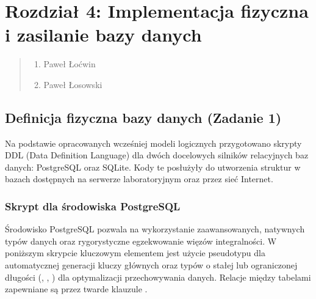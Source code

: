 \documentclass[letterpaper,10pt,english]{sphinxmanual}
\begin{document}
\chapter{Rozdział 4: Implementacja fizyczna i zasilanie bazy danych}
\label{\detokenize{rozdzial_4/index:rozdzial-4-implementacja-fizyczna-i-zasilanie-bazy-danych}}\label{\detokenize{rozdzial_4/index::doc}}\begin{quote}\begin{description}
\begin{enumerate}
%
\item {} 
\sphinxAtStartPar
Paweł Łoćwin

\item {} 
\sphinxAtStartPar
Paweł Łosowski

\end{enumerate}

\end{description}\end{quote}


\section{Definicja fizyczna bazy danych (Zadanie 1)}
\label{\detokenize{rozdzial_4/index:definicja-fizyczna-bazy-danych-zadanie-1}}
\sphinxAtStartPar
Na podstawie opracowanych wcześniej modeli logicznych przygotowano skrypty DDL (Data Definition Language) dla dwóch docelowych silników relacyjnych baz danych: PostgreSQL oraz SQLite. Kody te posłużyły do utworzenia struktur w bazach dostępnych na serwerze laboratoryjnym oraz przez sieć Internet.


\subsection{Skrypt dla środowiska PostgreSQL}
\label{\detokenize{rozdzial_4/index:skrypt-dla-srodowiska-postgresql}}
\sphinxAtStartPar
Środowisko PostgreSQL pozwala na wykorzystanie zaawansowanych, natywnych typów danych oraz rygorystyczne egzekwowanie więzów integralności. W poniższym skrypcie kluczowym elementem jest użycie pseudo\sphinxhyphen{}typu  dla automatycznej generacji kluczy głównych oraz typów o stałej lub ograniczonej długości (, , ) dla optymalizacji przechowywania danych. Relacje między tabelami zapewniane są przez twarde klauzule .
\end{document}
